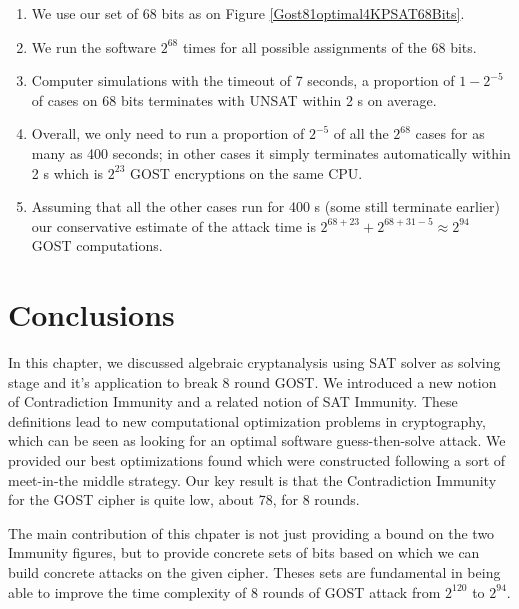 \begin{enumerate}
	\item
	We use our set of 68 bits as
	on Figure \ref{Gost81optimal4KPSAT68Bits}. %
	\item
	We run the software $2^{68}$ times for all possible assignments of the 68 bits.
	\item
	Computer simulations
	with the timeout of 7 seconds,
	a proportion of $1-2^{-5}$ of cases on 68 bits terminates with UNSAT
	within 2 s on average.
	\item
	Overall, we only need to run a proportion of $2^{-5}$ of all the $2^{68}$ cases
	for as many as 400 seconds;
	in other cases it simply terminates automatically within 2 s
	which is $2^{23}$ GOST encryptions on the same CPU.
	\item
	Assuming that all the other cases run for 400 s (some still terminate earlier)
	our conservative estimate of the attack time is
	$2^{68+23}+2^{68+31-5}\approx 2^{94}$ GOST computations.
\end{enumerate}

\section{Conclusions}
In this chapter, we discussed algebraic cryptanalysis using SAT solver as solving stage and it's application to break 8 round GOST. We introduced a new notion of Contradiction Immunity and a related notion of SAT Immunity. These definitions lead to new computational optimization problems in cryptography, which can be seen as looking for an optimal software guess-then-solve attack. We provided our best optimizations found which were constructed following a sort of meet-in-the middle strategy. Our key result is that the Contradiction Immunity for the GOST cipher is quite low, about 78, for 8 rounds. 

The main contribution of this chpater is not just providing a bound on the two Immunity figures, but to provide concrete sets of bits based on which we can build concrete attacks on the given cipher. Theses sets are fundamental in being able to improve the time complexity of 8 rounds of GOST attack from $2^{120}$ to $2^{94}$. 

